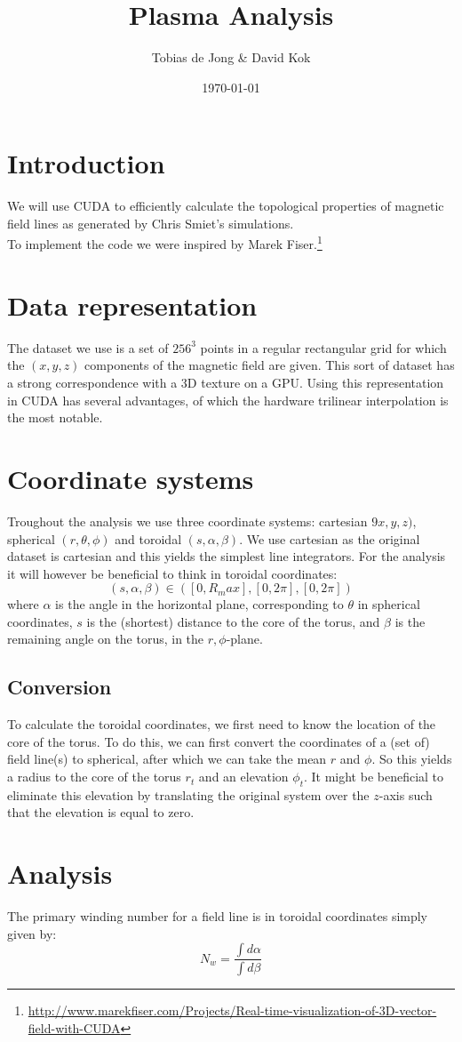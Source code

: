 \documentclass{article}
\begin{document}
\title{Plasma Analysis}
\author{Tobias de Jong \& David Kok}
\date{\today}
\maketitle
\section{Introduction}
We will use CUDA to efficiently calculate the topological properties of magnetic field lines as generated by Chris Smiet's simulations.\cite{PhysRevLett.115.095001}\\
To implement the code we were inspired by Marek Fiser.\footnote{\url{http://www.marekfiser.com/Projects/Real-time-visualization-of-3D-vector-field-with-CUDA}}
\section{Data representation}
The dataset we use is a set of $256^3$ points in a regular rectangular grid for which the $(x,y,z)$ components of the magnetic field are given. This sort of dataset has a strong correspondence with a 3D texture on a GPU. Using this representation in CUDA has several advantages, of which the hardware trilinear interpolation is the most notable.
\section{Coordinate systems}
Troughout the analysis we use three coordinate systems: cartesian $9x,y,z)$, spherical $(r,\theta,\phi)$ and toroidal $(s,\alpha, \beta)$. We use cartesian as the original dataset is cartesian and this yields the simplest line integrators. For the analysis it will however be beneficial to think in toroidal coordinates:
\[(s,\alpha,\beta)\in ([0,R_max],[0,2\pi],[0,2\pi])\]
where $\alpha$ is the angle in the horizontal plane, corresponding to $\theta$ in spherical coordinates, $s$ is the (shortest) distance to the core of the torus, and $\beta$ is the remaining angle on the torus, in the $r,\phi$-plane.
\subsection{Conversion}
To calculate the toroidal coordinates, we first need to know the location of the core of the torus. To do this, we can first convert the coordinates of a (set of) field line(s) to spherical, after which we can take the mean $r$ and $\phi$. So this yields a radius to the core of the torus $r_t$ and an elevation $\phi_t$. It might be beneficial to eliminate this elevation by translating the original system over the $z$-axis such that the elevation is equal to zero.
\section{Analysis}
The primary winding number for a field line is in toroidal coordinates simply given by:
\[N_w = \frac{\int d\alpha}{\int d\beta}\]


\end{document}
